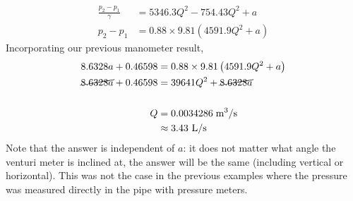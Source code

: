 \documentclass[10pt]{amsart}
\begin{document}
\begin{minipage}[t]{0.85\textwidth}
\begin{align*}
		\frac{p_2-p_1}{\gamma}                      & = 5346.3Q^2-754.43Q^2+a                       \\
		p_2-p_1                                     & = 0.88\times9.81\left(4591.9Q^2+a\right)      
	\end{align*}
	Incorporating our previous manometer result,
	\begin{align*}
		8.6328a+0.46598          & = 0.88\times9.81\left(4591.9Q^2+a\right) \\
		\cancel{8.6328a}+0.46598 & = 39641Q^2+ \cancel{8.6328a}             \\\\
		Q                        & = 0.0034286\;\mathrm{m^3/s}              \\
		                         & \approx 3.43\text{ L/s}                  
	\end{align*}
	Note that the answer is independent of $a$: it does not matter what angle the venturi meter
	is inclined at, the answer will be the same (including vertical or horizontal). This was not the
	case in the previous examples where the pressure was measured directly in the pipe with pressure meters.
\end{minipage}
\end{document}
